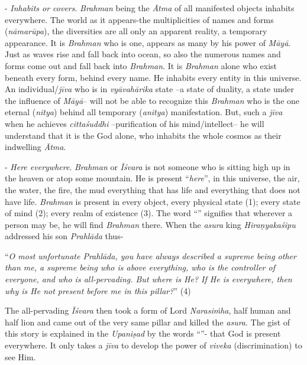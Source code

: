 - \emph{Inhabits or covers}. \emph{Brahman} being the \emph{Ātma} of all manifested objects inhabits everywhere. The world as it appears-the multiplicities of names and forms (\emph{nāmarūpa}), the diversities are all only an apparent reality, a temporary appearance. It is \emph{Brahman} who is one, appears as many by his power of \emph{Māyā}. Just as waves rise and fall back into ocean, so also the numerous names and forms come out and fall back into \emph{Brahman}. It is \emph{Brahman} alone who exist beneath every form, behind every name. He inhabits every entity in this universe. An individual/\emph{jīva} who is in \emph{vyāvahārika} state --a state of duality, a state under the influence of \emph{Māyā}-- will not be able to recognize this \emph{Brahman} who is the one eternal (\emph{nitya}) behind all temporary (\emph{anitya}) manifestation. But, such a \emph{jīva} when he achieves \emph{cittaśuddhi} --purification of his mind/intellect-- he will understand that it is the God alone, who inhabits the whole cosmos as their indwelling \emph{Ātma}.

 - \emph{Here everywhere}. \emph{Brahman} or \emph{Īśvara} is not someone who is sitting high up in the heaven or atop some mountain. He is present ``\emph{here}'', in this universe, the air, the water, the fire, the mud everything that has life and everything that does not have life. \emph{Brahman} is present in every object, every physical state (1); every state of mind (2); every realm of existence (3). The word ``'' signifies that wherever a person may be, he will find \emph{Brahman} there. When the \emph{asura} king \emph{Hiraṇyakaśipu} addressed his son \emph{Prahlāda} thus-

``\emph{O most unfortunate Prahlāda, you have always described a supreme being other than me, a supreme being who is above everything, who is the controller of everyone, and who is all-pervading. But where is He? If He is everywhere, then why is He not present before me in this pillar?}'' (4)

The all-pervading \emph{Īśvara} then took a form of Lord \emph{Narasiṁha}, half human and half lion and came out of the very same pillar and killed the \emph{asura}. The gist of this story is explained in the \emph{Upaniṣad} by the words ``''- that God is present everywhere. It only takes a \emph{jīva} to develop the power of \emph{viveka} (discrimination) to see Him.

